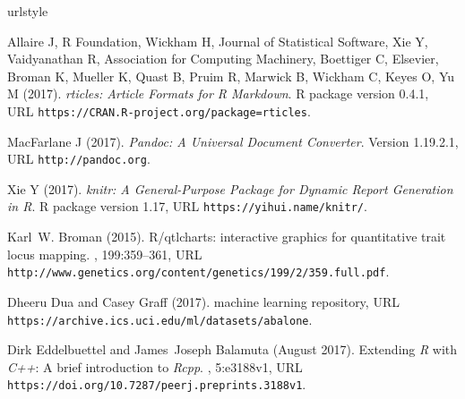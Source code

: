 \begin{thebibliography}{3}
\newcommand{\enquote}[1]{``#1''}
\providecommand{\natexlab}[1]{#1}
\providecommand{\url}[1]{\texttt{#1}}
\providecommand{\urlprefix}{URL }
\expandafter\ifx\csname urlstyle\endcsname\relax
  \providecommand{\doi}[1]{doi:\discretionary{}{}{}#1}\else
  \providecommand{\doi}{doi:\discretionary{}{}{}\begingroup
  \urlstyle{rm}\Url}\fi
\providecommand{\eprint}[2][]{\url{#2}}



Allaire J, {R Foundation}, Wickham H, {Journal of Statistical Software}, Xie Y,
  Vaidyanathan R, {Association for Computing Machinery}, Boettiger C,
  {Elsevier}, Broman K, Mueller K, Quast B, Pruim R, Marwick B, Wickham C,
  Keyes O, Yu M (2017).
\newblock \emph{rticles: Article Formats for R Markdown}.
\newblock R package version 0.4.1,
  \urlprefix\url{https://CRAN.R-project.org/package=rticles}.

MacFarlane J (2017).
\newblock \emph{Pandoc: A Universal Document Converter}.
\newblock Version 1.19.2.1, \urlprefix\url{http://pandoc.org}.

Xie Y (2017).
\newblock \emph{knitr: A General-Purpose Package for Dynamic Report Generation
  in R}.
\newblock R package version 1.17, \urlprefix\url{https://yihui.name/knitr/}.

Karl~W. Broman (2015).
\newblock R/qtlcharts: interactive graphics for quantitative trait locus
  mapping.
, 199:359--361, \urlprefix\url{http://www.genetics.org/content/genetics/199/2/359.full.pdf}.

Dheeru Dua and Casey Graff (2017).
 machine learning repository, \urlprefix\url{https://archive.ics.uci.edu/ml/datasets/abalone}.

Dirk Eddelbuettel and James~Joseph Balamuta (August 2017).
\newblock Extending \textit{R} with \textit{C++}: A brief introduction to
  \textit{Rcpp}.
, 5:e3188v1, \urlprefix \url{https://doi.org/10.7287/peerj.preprints.3188v1}.


\end{thebibliography}
